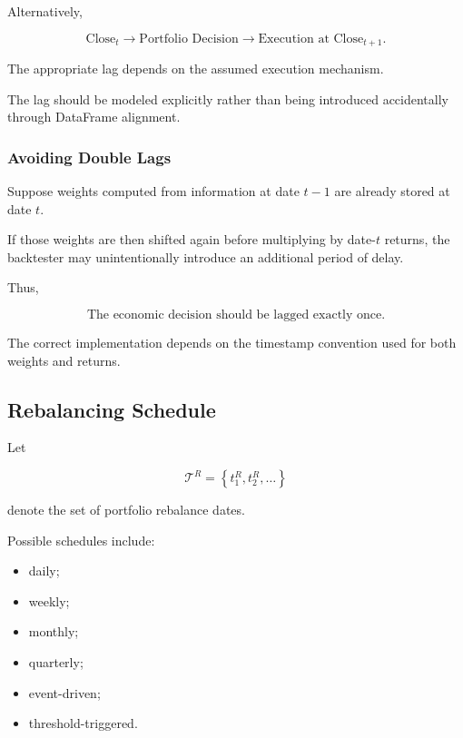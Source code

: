 \documentclass[11pt,a4paper]{article}
\begin{document}
Alternatively,

\begin{equation}
\boxed{
\text{Close}_t
\rightarrow
\text{Portfolio Decision}
\rightarrow
\text{Execution at Close}_{t+1}.
}
\end{equation}

The appropriate lag depends on the assumed execution mechanism.

The lag should be modeled explicitly rather than being introduced accidentally
through DataFrame alignment.


\subsubsection{Avoiding Double Lags}

Suppose weights computed from information at date $t-1$ are already stored at
date $t$.

If those weights are then shifted again before multiplying by date-$t$ returns,
the backtester may unintentionally introduce an additional period of delay.

Thus,

\begin{equation}
\boxed{
\text{The economic decision should be lagged exactly once.}
}
\end{equation}

The correct implementation depends on the timestamp convention used for both
weights and returns.


\subsection{Rebalancing Schedule}

Let

\begin{equation}
\mathcal{T}^{R}
=
\left\{
t_1^{R},
t_2^{R},
\ldots
\right\}
\end{equation}

denote the set of portfolio rebalance dates.

Possible schedules include:

\begin{itemize}
    \item daily;
    \item weekly;
    \item monthly;
    \item quarterly;
    \item event-driven;
    \item threshold-triggered.
\end{itemize}
\end{document}
